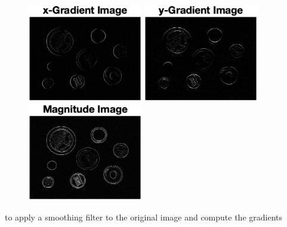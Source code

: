 \documentclass[12pt]{article}
\begin{document}
\begin{figure}[htp]
    \centering
    \includegraphics[width=5cm]{x.png}
    \includegraphics[width=5cm]{y.png}
    \includegraphics[width=5cm]{magnitude.png}
\end{figure}

to apply a smoothing filter to the original image and compute the gradients\\
\end{document}
